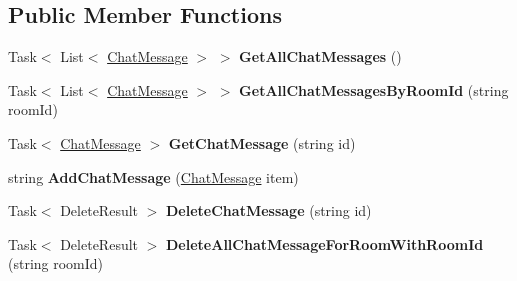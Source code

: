 \subsection*{Public Member Functions}
\begin{DoxyCompactItemize}
\item 
\hypertarget{interface_wis_r_rest_a_p_i_1_1_providers_1_1_i_chat_repository_a0b3c72561ef06fd05b1e8f1af8666306}{}Task$<$ List$<$ \hyperlink{class_wis_r_1_1_domain_model_1_1_chat_message}{Chat\+Message} $>$ $>$ {\bfseries Get\+All\+Chat\+Messages} ()\label{interface_wis_r_rest_a_p_i_1_1_providers_1_1_i_chat_repository_a0b3c72561ef06fd05b1e8f1af8666306}

\item 
\hypertarget{interface_wis_r_rest_a_p_i_1_1_providers_1_1_i_chat_repository_a551990cca076ece90e32dcb59ad09d4f}{}Task$<$ List$<$ \hyperlink{class_wis_r_1_1_domain_model_1_1_chat_message}{Chat\+Message} $>$ $>$ {\bfseries Get\+All\+Chat\+Messages\+By\+Room\+Id} (string room\+Id)\label{interface_wis_r_rest_a_p_i_1_1_providers_1_1_i_chat_repository_a551990cca076ece90e32dcb59ad09d4f}

\item 
\hypertarget{interface_wis_r_rest_a_p_i_1_1_providers_1_1_i_chat_repository_a37021395a89eb12b85ebd7a35a3e1186}{}Task$<$ \hyperlink{class_wis_r_1_1_domain_model_1_1_chat_message}{Chat\+Message} $>$ {\bfseries Get\+Chat\+Message} (string id)\label{interface_wis_r_rest_a_p_i_1_1_providers_1_1_i_chat_repository_a37021395a89eb12b85ebd7a35a3e1186}

\item 
\hypertarget{interface_wis_r_rest_a_p_i_1_1_providers_1_1_i_chat_repository_a36055022078f8e72ef73716acf6ff09a}{}string {\bfseries Add\+Chat\+Message} (\hyperlink{class_wis_r_1_1_domain_model_1_1_chat_message}{Chat\+Message} item)\label{interface_wis_r_rest_a_p_i_1_1_providers_1_1_i_chat_repository_a36055022078f8e72ef73716acf6ff09a}

\item 
\hypertarget{interface_wis_r_rest_a_p_i_1_1_providers_1_1_i_chat_repository_add423c07297442ae57633961a8ff72b1}{}Task$<$ Delete\+Result $>$ {\bfseries Delete\+Chat\+Message} (string id)\label{interface_wis_r_rest_a_p_i_1_1_providers_1_1_i_chat_repository_add423c07297442ae57633961a8ff72b1}

\item 
\hypertarget{interface_wis_r_rest_a_p_i_1_1_providers_1_1_i_chat_repository_a645d47f4be8ffdb5a24ca6132f063153}{}Task$<$ Delete\+Result $>$ {\bfseries Delete\+All\+Chat\+Message\+For\+Room\+With\+Room\+Id} (string room\+Id)\label{interface_wis_r_rest_a_p_i_1_1_providers_1_1_i_chat_repository_a645d47f4be8ffdb5a24ca6132f063153}


\end{DoxyCompactItemize}

